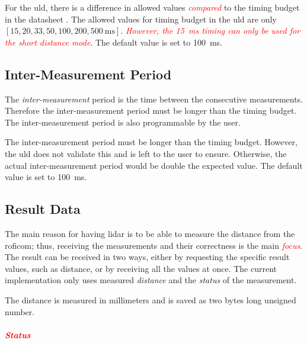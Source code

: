 \documentclass[
  digital,     %
  oneside,     %
  nosansbold,  %
  nocolorbold, %
  nolof,         %
  nolot,         %
]{fithesis4}
\newcommand{\TODO}[1]{\textcolor{red}{\textit{#1}}}
\begin{document}
{{{For the \acrshort{uld}, there is a difference in allowed values \TODO{compared} to the timing budget in the datasheet \cite{vl53l1x}. The allowed values for timing budget in the \acrshort{uld} are only $[15, 20,
33, 50, 100, 200, \qty{500}{\milli\second}]$. \TODO{However, the \qty{15}{\milli\second} timing can only be used for the short distance mode}. The default value is set to \qty{100}{\milli\second}.

\subsection{ Inter-Measurement Period }
The \emph{inter-measurement} period is the time between the consecutive measurements. Therefore the inter-measurement period must be longer than the timing budget. The inter-measurement period is also programmable by the user.

The inter-measurement period must be longer than the timing budget. However, the \acrshort{uld} does not validate this and is left to the user to ensure. Otherwise, the actual inter-measurement period would be double the expected value. The default value is set to \qty{100}{\milli\second}.

\subsection{ Result Data } \label{sec:lidar-result}

The main reason for having \acrshort{lidar} is to be able to measure the distance from the \acrshort{roficom}; thus, receiving the measurements and their correctness is the main \TODO{focus}. The result can be received in two ways, either by requesting the specific result values, such as distance, or by receiving all the values at once. The current implementation only uses measured \emph{distance} and the \emph{status} of the measurement.

The distance is measured in millimeters and is saved as two bytes long unsigned number.

\paragraph{\TODO{Status}}

}}}
\end{document}
